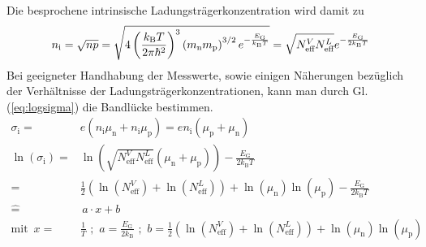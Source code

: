 \documentclass[numbers=noenddot,14pt,a4paper]{scrartcl}
\newcommand{\ix}[1]{_\text{#1}}
\newcommand{\euler}{\mathnormal{e}}
\begin{document}
Die besprochene intrinsische Ladungsträgerkonzentration wird damit zu
\begin{align}
	n\ix{i}=\sqrt{np}=\sqrt{4\left(\frac{k\ix{B}T}{2\pi\hbar^2}\right)^3\left(m\ix{n}m\ix{p}\right)^{3/2}\euler^{-\frac{E\ix{G}}{k\ix{B}T}}}=\sqrt{N^{V}\ix{eff}N^{L}\ix{eff}}\euler^{-\frac{E\ix{G}}{2k\ix{B}T}} \label{eq:intrin}
\end{align}
Bei geeigneter Handhabung der Messwerte, sowie einigen Näherungen bezüglich der Verhältnisse der Ladungsträgerkonzentrationen, kann man durch Gl. (\ref{eq:logsigma}) die Bandlücke bestimmen.
\begin{align}
	\sigma\ix{i}=&e\left(n\ix{i}\mu\ix{n}+n\ix{i}\mu\ix{p}\right)=en\ix{i}\left(\mu\ix{p}+\mu\ix{n}\right) \nonumber \\
	\ln{\left(\sigma\ix{i}\right)}=&\ln{\left(\sqrt{N^{V}\ix{eff}N^{L}\ix{eff}}\left(\mu\ix{n}+\mu\ix{p}\right)\right)}-\frac{E\ix{G}}{2k\ix{B}T} \nonumber \\
	=&\frac{1}{2}\left(\ln\left(N^{V}\ix{eff}\right)+\ln\left(N^{L}\ix{eff}\right)\right)+\ln\left(\mu\ix{n}\right)\ln\left(\mu\ix{p}\right)-\frac{E\ix{G}}{2k\ix{B}T} \label{eq:logsigma} \\
	\hat{=}&\,a\cdot x+b \nonumber \\
	\text{mit} \,\,\, x=&\frac{1}{T} \,\,;\,\, a=\frac{E\ix{G}}{2k\ix{B}} \,\,;\,\, b=\frac{1}{2}\left(\ln\left(N^{V}\ix{eff}\right)+\ln\left(N^{L}\ix{eff}\right)\right)+\ln\left(\mu\ix{n}\right)\ln\left(\mu\ix{p}\right) \nonumber
\end{align}
\end{document}
